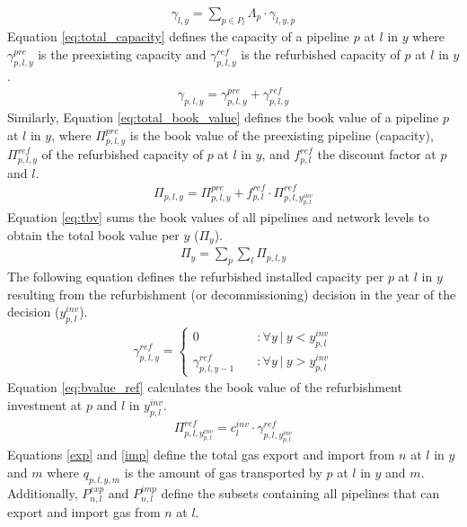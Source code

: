 \begin{align}\label{eq:gamma}
	\gamma_{l, y} = \sum_{p \in P_{l}} \Lambda_{p} \cdot \gamma_{l, y, p}
\end{align}
Equation \ref{eq:total_capacity} defines the capacity of a pipeline $p$ at $l$ in $y$ where $\gamma^{pre}_{p,l,y}$ is the preexisting capacity and $\gamma^{ref}_{p,l,y}$ is the refurbished capacity of $p$ at $l$ in $y$. 
\begin{align}\label{eq:total_capacity}
	\gamma_{p,l, y} = \gamma^{pre}_{p,l,y} + \gamma^{ref}_{p,l,y}
\end{align}
Similarly, Equation \ref{eq:total_book_value} defines the book value of a pipeline $p$ at $l$ in $y$, where $\Pi^{pre}_{p,l,y}$ is the book value of the preexisting pipeline (capacity), $\Pi^{ref}_{p,l,y}$ of the refurbished capacity of $p$ at $l$ in $y$, and $f^{ref}_{p,l}$ the discount factor at $p$ and $l$.
\begin{align}\label{eq:total_book_value}
	\Pi_{p,l,y} = \Pi^{pre}_{p,l,y} + f^{ref}_{p,l} \cdot \Pi^{ref}_{p,l,y^{inv}_{p,l}}
\end{align}
Equation \ref{eq:tbv} sums the book values of all pipelines and network levels to obtain the total book value per $y$ ($\Pi_y$).
\begin{align}\label{eq:tbv}
	\Pi_{y} = \sum_{p} \sum_{l} \Pi_{p,l,y}
\end{align}
The following equation defines the refurbished installed capacity per $p$ at $l$ in $y$ resulting from the refurbishment (or decommissioning) decision in the year of the decision ($y^{inv}_{p,l}$).
\begin{align}\label{9}
	\gamma^{ref}_{p,l,y} = \begin{cases}
		0 & \quad:\forall y~|~y<y^{inv}_{p,l}\\
		\gamma^{ref}_{p,l,y-1} & \quad:\forall y~|~y>y^{inv}_{p,l}
	\end{cases}
\end{align}
Equation \ref{eq:bvalue_ref} calculates the book value of the refurbishment investment at $p$ and $l$ in $y^{inv}_{p,l}$.
\begin{align}\label{eq:bvalue_ref}
	\Pi^{ref}_{p,l,y^{inv}_{p,l}} = c^{inv}_{l} \cdot \gamma^{ref}_{p,l,y^{inv}_{p,l}}
\end{align}
Equations \ref{exp} and \ref{imp} define the total gas export and import from $n$ at $l$ in $y$ and $m$ where $q_{p,l,y,m}$ is the amount of gas transported by $p$ at $l$ in $y$ and $m$. Additionally, $P^{exp}_{n,l}$ and $P^{imp}_{n,l}$ define the subsets containing all pipelines that can export and import gas from $n$ at $l$.
